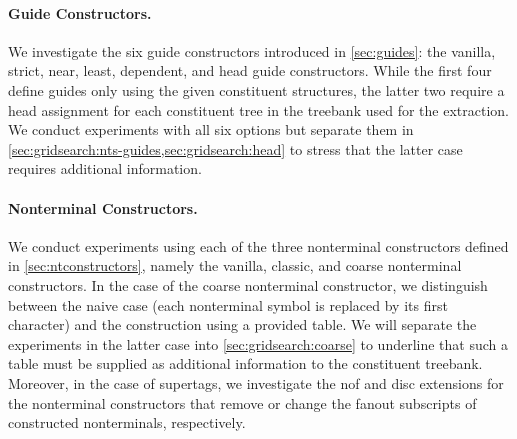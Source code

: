 \documentclass[../../document.tex]{subfiles}
\begin{document}
    \paragraph*{Guide Constructors.}
    We investigate the six guide constructors introduced in \cref{sec:guides}: the vanilla, strict, near, least, dependent, and head guide constructors.
    While the first four define guides only using the given constituent structures, the latter two require a head assignment for each constituent tree in the treebank used for the extraction.
    We conduct experiments with all six options but separate them in \cref{sec:gridsearch:nts-guides,sec:gridsearch:head} to stress that the latter case requires additional information.

    \paragraph*{Nonterminal Constructors.}
    We conduct experiments using each of the three nonterminal constructors defined in \cref{sec:ntconstructors}, namely the vanilla, classic, and coarse nonterminal constructors.
    In the case of the coarse nonterminal constructor, we distinguish between the naive case (each nonterminal symbol is replaced by its first character) and the construction using a provided table.
    We will separate the experiments in the latter case into \cref{sec:gridsearch:coarse} to underline that such a table must be supplied as additional information to the constituent treebank.
    Moreover, in the case of  supertags, we investigate the nof and disc extensions for the nonterminal constructors that remove or change the fanout subscripts of constructed nonterminals, respectively.
\end{document}
